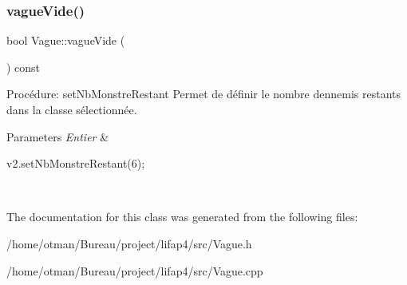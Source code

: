 \subsubsection{\texorpdfstring{vague\+Vide()}{vagueVide()}}
{\footnotesize\ttfamily bool Vague\+::vague\+Vide (\begin{DoxyParamCaption}{ }\end{DoxyParamCaption}) const}



Procédure\+: set\+Nb\+Monstre\+Restant Permet de définir le nombre d\textquotesingle{}ennemis restants dans la classe sélectionnée. 


\begin{DoxyParams}{Parameters}
{\em Entier} & 
\begin{DoxyCode}
v2.setNbMonstreRestant(6);
\end{DoxyCode}
 \\
\hline
\end{DoxyParams}


The documentation for this class was generated from the following files\+:\begin{DoxyCompactItemize}
\item 
/home/otman/\+Bureau/project/lifap4/src/Vague.\+h\item 
/home/otman/\+Bureau/project/lifap4/src/Vague.\+cpp\end{DoxyCompactItemize}
